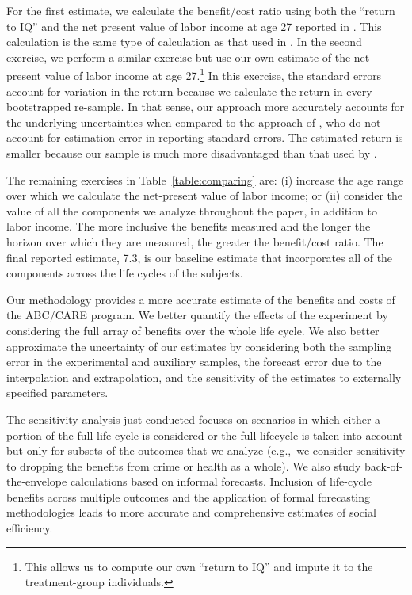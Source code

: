 For the first estimate, we calculate the benefit/cost ratio using both the ``return to IQ'' and the net present value of labor income at age 27 reported in \citet{Chetty_Friedman_etal_2011_QJoE}. This calculation is the same type of calculation as that used in \citet{Kline_Walters_2016_QJE}. In the second exercise, we perform a similar exercise but use our own estimate of the net present value of labor income at age 27.\footnote{This allows us to compute our own ``return to IQ'' and impute it to the treatment-group individuals.} In this exercise, the standard errors account for variation in the return because we calculate the return in every bootstrapped re-sample. In that sense, our approach more accurately accounts for the underlying uncertainties when compared to the approach of \citet{Kline_Walters_2016_QJE}, who do not account for estimation error in reporting standard errors. The estimated return is smaller because our sample is much more disadvantaged than that used by \citet{Chetty_Friedman_etal_2011_QJoE}.

The remaining exercises in Table~\ref{table:comparing} are: (i) increase the age range over which we calculate the net-present value of labor income; or (ii) consider the value of all the components we analyze throughout the paper, in addition to labor income. The more inclusive the benefits measured and the longer the horizon over which they are measured, the greater the benefit/cost ratio. The final reported estimate, 7.3, is our baseline estimate that incorporates all of the components across the life cycles of the subjects.

Our methodology provides a more accurate estimate of the benefits and costs of the ABC/CARE program. We better quantify the effects of the experiment by considering the full array of benefits over the whole life cycle. We also better approximate the uncertainty of our estimates by considering both the sampling error in the experimental and auxiliary samples, the forecast error due to the interpolation and extrapolation, and the sensitivity of the estimates to externally specified parameters.

The sensitivity analysis just conducted focuses on scenarios in which either a portion of the full life cycle is considered or the full lifecycle is taken into account but only for subsets of the outcomes that we analyze (e.g.,\ we consider sensitivity to dropping the benefits from crime or health as a whole).  We also study back-of-the-envelope calculations based on informal forecasts. Inclusion of life-cycle benefits across multiple outcomes and the application of formal forecasting methodologies leads to more accurate and comprehensive estimates of social efficiency.

